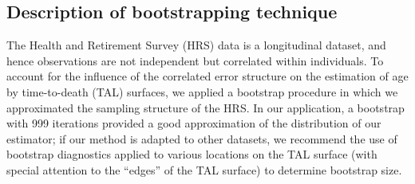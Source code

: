\documentclass[12pt,oneside,a4paper]{article} %
\begin{document}
\begin{appendices}
% 


\section{Description of bootstrapping technique}
The Health and Retirement Survey (HRS) data is a longitudinal dataset, and hence
observations are not independent but correlated within individuals. To account
for the influence of the correlated error structure on the estimation of age
by time-to-death (TAL) surfaces, we applied a bootstrap
\citep{efron1994introduction} procedure in which we approximated the sampling structure of the HRS. In our
application, a bootstrap with 999 iterations provided a good approximation of the distribution of our estimator; if our method is adapted to other datasets, we recommend the use of bootstrap diagnostics applied to various locations on the TAL surface (with special attention to the ``edges'' of the TAL surface) to determine bootstrap size.


\end{appendices}
\end{document}
